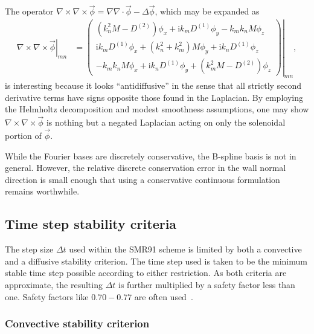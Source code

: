 \documentclass[letterpaper,11pt,nointlimits,reqno,draft]{amsart}
\newcommand{\ii}{\ensuremath{\mathrm{i}}}
\begin{document}
The operator $\nabla\times\nabla\times\vec{\phi} = \nabla\nabla\cdot\vec{\phi}
- \Delta\vec{\phi}$, which may be expanded as
\begin{align}
  \left.\nabla\times\nabla\times\vec{\phi}\right|_{m n}
&=
  \left.\begin{pmatrix}
    \left(k_n^2 M - D^{(2)}\right) \phi_{x} + \ii k_m D^{(1)} \phi_{y} - k_{m}k_{n} M \phi_{z} \\
    \ii k_m D^{(1)} \phi_{x} + \left(k_n^2 + k_m^2\right)M \phi_{y} + \ii k_n D^{(1)} \phi_{z} \\
    - k_{m}k_{n} M \phi_{x} + \ii k_n D^{(1)} \phi_{y} + \left(k_m^2 M - D^{(2)}\right) \phi_{z}
  \end{pmatrix}\right|_{m n}
  ,
\end{align}
is interesting because it looks ``antidiffusive'' in the sense that all
strictly second derivative terms have signs opposite those found in the
Laplacian.  By employing the Helmholtz decomposition and modest smoothness
assumptions, one may show $\nabla\times\nabla\times\vec{\phi}$ is nothing but a
negated Laplacian acting on only the solenoidal portion of $\vec{\phi}$.

While the Fourier bases are discretely conservative, the B-spline basis is not
in general.  However, the relative discrete conservation error in the wall
normal direction is small enough that using a conservative continuous
formulation remains worthwhile.

\subsection{Time step stability criteria}
\label{sec:stabilitycriteria}

The step size $\Delta{}t$ used within the SMR91 scheme is limited by both a
convective and a diffusive stability criterion.  The time step used is taken to
be the minimum stable time step possible according to either restriction.  As
both criteria are approximate, the resulting $\Delta{}t$ is further multiplied
by a safety factor less than one.  Safety factors like $0.70-0.77$ are often
used~\citep{Venugopal2003,spalart_lowstoragerk}.

\subsubsection{Convective stability criterion}
\label{sec:convectivestability}
\end{document}
